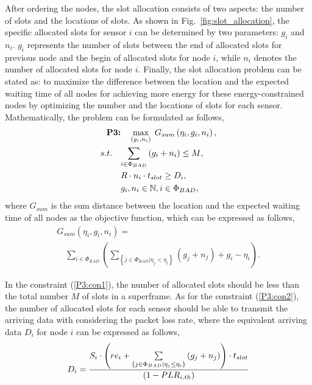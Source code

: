 \documentclass[journal,10pt]{IEEEtran}
\begin{document}
After ordering the nodes, the slot allocation consists of two aspects: the number of slots and the locations of slots. As shown in Fig.~\ref{fig:slot_allocation}, the specific allocated slots for sensor $i$ can be determined by two parameters: $g_{i}$ and $n_{i}$. $g_{i}$ represents the number of slots between the end of allocated slots for previous node and the begin of allocated slots for node $i$, while $n_{i}$ denotes the number of allocated slots for node $i$. 
Finally, the slot allocation problem can be stated as: to maximize the difference between the location and the expected waiting time of all nodes for achieving more energy for these energy-constrained nodes by optimizing the number and the locations of slots for each sensor. Mathematically, the problem can be formulated as follows,
\begin{subequations} \label{P3:slot_allocation}
\begin{align}
    \textbf{P3:}& \quad \mathop {\max }\limits_{\small{({g_{i},{n_i}})}} \;  {G_{sum}}\left(\eta_{i},{g_{i},{n_i}} \right), \label{P3:obj} \\
    s.t.\quad & {\sum\limits_{i \in {\Phi _{BAD}}} {\left( {{g_i} + {n_i}} \right) } \le M} , \label{P3:con1} \\
		& R \cdot {n_i} \cdot {t_{slot}} \ge D_{i},\label{P3:con2}\\
    & {{g_i},{n_i} \in {\Bbb N}}, i \in {\Phi _{BAD}}, \label{P3:con3}
\end{align}
\end{subequations}
where ${G_{sum}}$ is the sum distance between the location and the expected waiting time of all nodes as the objective function, which can be expressed as follows,
\begin{equation}\label{math:sum_gain}
\begin{array}{l}
    {G_{sum}}\left(\eta_{i},{g_{i},{n_i}} \right) = \\
    \quad {\sum\limits_{i \in {\Phi _{BAD}}} {\left( {\sum\limits_{\left\{ {j \in {\Phi _{BAD}}|{\eta _j} < {\eta _i}} \right\}} {\left( {{g_j} + {n_j}} \right) + {g_i} - {\eta _i}} } \right)} }.
\end{array}
\end{equation}

In the constraint (\ref{P3:con1}), the number of allocated slots should be less than the total number $M$ of slots in a superframe. As for the constraint (\ref{P3:con2}), the number of allocated slots for each sensor should be able to transmit the arriving data with considering the packet loss rate, where the equivalent arriving data $D_{i}$ for node $i$ can be expressed as follows,
\begin{equation}
D_{i}={{{S_i} \cdot \left( {r{e_i} + \sum\limits_{\left\{ {j \in {\Phi _{BAD}}|{\eta _j} \le {\eta _i}} \right\}} {\left( {{g_j} + {n_j}} \right)} } \right) \cdot {t_{slot}}} \over {\left( {1 - PL{R_{i,th}}} \right)}}
\end{equation}
\end{document}
